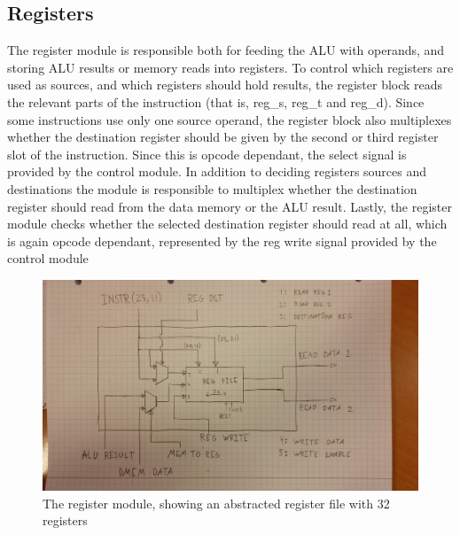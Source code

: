 \subsection{Registers}

The register module is responsible both for feeding the ALU with operands, and storing ALU results or memory reads into registers.
To control which registers are used as sources, and which registers should hold results, the register block reads the relevant parts of the instruction (that is, reg\_s, reg\_t and reg\_d). 
Since some instructions use only one source operand, the register block also multiplexes whether the destination register should be given by the second or third register slot of the instruction. Since this is opcode dependant, the select signal is provided by the control module.
In addition to deciding registers sources and destinations the module is responsible to multiplex whether the destination register should read from the data memory or the ALU result.
Lastly, the register module checks whether the selected destination register should read at all, which is again opcode dependant, represented by the reg write signal provided by the control module


\begin{figure}[h!]
    \includegraphics[width=\linewidth]{img/regs.jpg}
    \caption{The register module, showing an abstracted register file with 32 registers}
    \label{fig:registers}
\end{figure}

